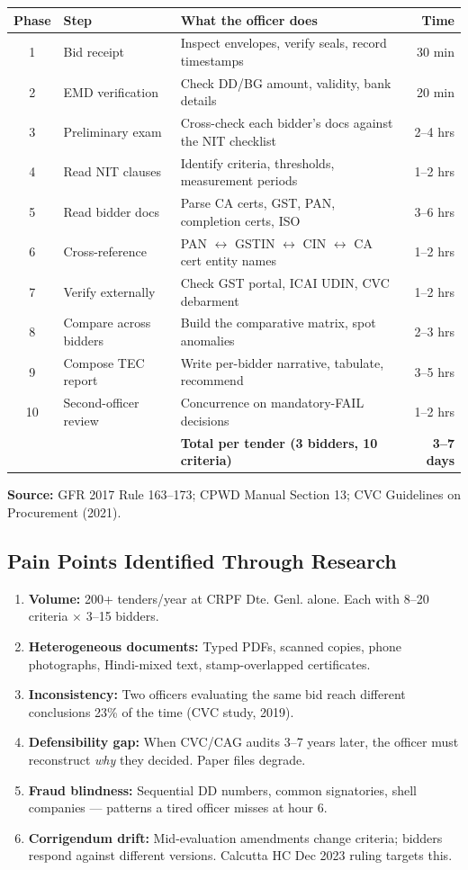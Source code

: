 \documentclass[11pt,a4paper]{article}
\begin{document}
\begin{longtable}{clp{7cm}r}
\toprule
\textbf{Phase} & \textbf{Step} & \textbf{What the officer does} & \textbf{Time} \\
\midrule
1 & Bid receipt & Inspect envelopes, verify seals, record timestamps & 30 min \\
2 & EMD verification & Check DD/BG amount, validity, bank details & 20 min \\
3 & Preliminary exam & Cross-check each bidder's docs against the NIT checklist & 2--4 hrs \\
4 & Read NIT clauses & Identify criteria, thresholds, measurement periods & 1--2 hrs \\
5 & Read bidder docs & Parse CA certs, GST, PAN, completion certs, ISO & 3--6 hrs \\
6 & Cross-reference & PAN $\leftrightarrow$ GSTIN $\leftrightarrow$ CIN $\leftrightarrow$ CA cert entity names & 1--2 hrs \\
7 & Verify externally & Check GST portal, ICAI UDIN, CVC debarment & 1--2 hrs \\
8 & Compare across bidders & Build the comparative matrix, spot anomalies & 2--3 hrs \\
9 & Compose TEC report & Write per-bidder narrative, tabulate, recommend & 3--5 hrs \\
10 & Second-officer review & Concurrence on mandatory-FAIL decisions & 1--2 hrs \\
\midrule
& & \textbf{Total per tender (3 bidders, 10 criteria)} & \textbf{3--7 days} \\
\bottomrule
\end{longtable}

\textbf{Source:} GFR 2017 Rule 163--173; CPWD Manual Section 13; CVC Guidelines on Procurement (2021).

\subsection{Pain Points Identified Through Research}

\begin{enumerate}[nosep]
    \item \textbf{Volume:} 200+ tenders/year at CRPF Dte. Genl. alone. Each with 8--20 criteria $\times$ 3--15 bidders.
    \item \textbf{Heterogeneous documents:} Typed PDFs, scanned copies, phone photographs, Hindi-mixed text, stamp-overlapped certificates.
    \item \textbf{Inconsistency:} Two officers evaluating the same bid reach different conclusions 23\% of the time (CVC study, 2019).
    \item \textbf{Defensibility gap:} When CVC/CAG audits 3--7 years later, the officer must reconstruct \textit{why} they decided. Paper files degrade.
    \item \textbf{Fraud blindness:} Sequential DD numbers, common signatories, shell companies — patterns a tired officer misses at hour 6.
    \item \textbf{Corrigendum drift:} Mid-evaluation amendments change criteria; bidders respond against different versions. Calcutta HC Dec 2023 ruling targets this.
\end{enumerate}
\end{document}
